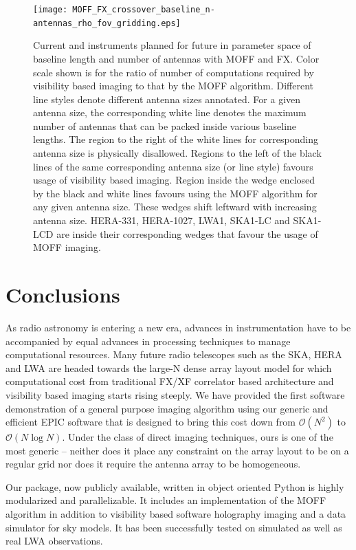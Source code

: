 \documentclass[a4paper,fleqn,usenatbib]{../mnras}
\begin{document}
\begin{figure}
  \texttt{[image: MOFF\_FX\_crossover\_baseline\_n-antennas\_rho\_fov\_gridding.eps]}
  \caption{Current and instruments planned for future in parameter space of
    baseline length and number of antennas with MOFF and FX. Color scale shown 
    is for the ratio of number of computations required by visibility based
    imaging to that by the MOFF algorithm. Different line styles denote 
    different antenna sizes annotated. For a given antenna size, the 
    corresponding white line denotes the maximum number of antennas that can 
    be packed inside various baseline lengths. The region to the right of the 
    white lines for corresponding antenna size is physically disallowed. 
    Regions to the left of the black lines of the same corresponding antenna 
    size (or line style) favours usage of visibility based imaging. Region 
    inside the wedge enclosed by the black and white lines favours using the 
    MOFF algorithm for any given antenna size. These wedges shift leftward with 
    increasing antenna size. HERA-331, HERA-1027, LWA1, SKA1-LC and SKA1-LCD
    are inside their corresponding wedges that favour the usage of MOFF 
    imaging.}
  \label{fig:parameter-space-bll-nant-instruments}
\end{figure}

\section{Conclusions}\label{sec:conclusions}

As radio astronomy is entering a new era, advances in instrumentation have to
be accompanied by equal advances in processing techniques to manage 
computational resources. Many future radio telescopes such as the SKA, HERA and 
LWA are headed towards the large-N dense array layout model for which 
computational cost from traditional FX/XF correlator based architecture and 
visibility based imaging starts rising steeply. We have provided the first 
software demonstration of a general purpose imaging algorithm using our generic 
and efficient EPIC software that is designed to bring this cost down from 
$\mathcal{O}(N^2)$ to $\mathcal{O}(N\log N)$. Under the class of direct imaging 
techniques, ours is one of the most generic -- neither does it place any 
constraint on the array layout to be on a regular grid nor does it require the
antenna array to be homogeneous. 

Our package, now publicly available, written in object oriented Python is 
highly modularized and parallelizable. It includes an implementation of the 
MOFF algorithm in addition to visibility based software holography imaging and 
a data simulator for sky models. It has been successfully tested on simulated 
as well as real LWA observations. 
\end{document}
